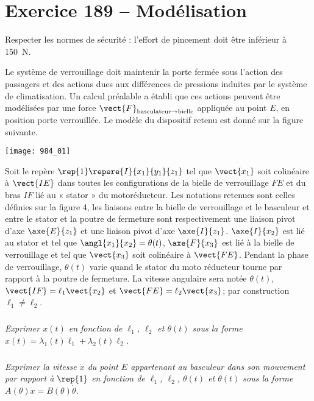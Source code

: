 \section*{Exercice 189 -- Modélisation}
\setcounter{exo}{0}


\begin{obj}
Respecter les normes de sécurité : l'effort de pincement doit être inférieur à \SI{150}{N}.
\end{obj}

Le système de verrouillage doit maintenir la porte fermée sous l’action des passagers et des
actions dues aux différences de pressions induites par le système de climatisation.
Un calcul préalable a établi que ces actions peuvent être modélisées par une
force $\vect{F}_{\text{basculateur}\rightarrow \text{bielle}}$ appliquée au point $E$, en position porte verrouillée. Le modèle du dispositif retenu est donné sur la figure suivante.

\begin{center}
\texttt{[image: 984\_01]}%
\end{center}

Soit le repère $\rep{1}\repere{I}{x_1}{y_1}{z_1}$ tel que $\vect{x_1}$ soit colinéaire à $\vect{IE}$ dans toutes
les configurations de la bielle de verrouillage $FE$ et du bras $IF$ lié au « stator »
du motoréducteur. Les notations retenues sont celles définies sur la figure 4, les
liaisons entre la bielle de verrouillage et le basculeur et entre le stator et la poutre
de fermeture sont respectivement une liaison pivot d’axe $\axe{E}{z_1}$ et une
liaison pivot d’axe $\axe{I}{z_1}$.
$\axe{I}{x_2}$ est lié au stator et tel que $\angl{x_1}{x_2}=\theta(t)$,
$\axe{F}{x_3}$ est lié à la bielle de verrouillage et tel que $\vect{x_3}$ soit colinéaire à $\vect{FE}$.
Pendant la phase de verrouillage, $\theta(t)$ varie quand le stator du moto réducteur
tourne par rapport à la poutre de fermeture. La vitesse angulaire sera notée
$\dot{\theta}(t)$, $\vect{IF}=\ell_1 \vect{x_2}$ et $\vect{FE}=\ell_2 \vect{x_3}$; par construction $\ell_1 \neq \ell_2$.

\subparagraph{}
\textit{Exprimer $x(t)$ en fonction de $\ell_1$, $\ell_2$ et $\theta(t)$ sous la forme
$x(t)=\lambda_1(t)\ell_1+\lambda_2(t)\ell_2$.}
\ifprof
\begin{corrige}
\end{corrige}
\else
\fi

\subparagraph{}
\textit{Exprimer la vitesse $\dot{x}$ du point $E$ appartenant au basculeur dans son mouvement
par rapport à $\rep{1}$ en fonction de $\ell_1$, $\ell_2$, $\theta(t)$ et $\dot{\theta}(t)$ sous la forme $A(\theta)\dot{x}=B(\theta)\dot{\theta}$.}
\ifprof
\begin{corrige}
\end{corrige}
\else
\fi


